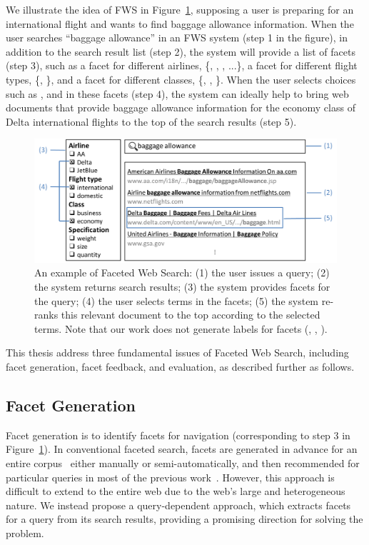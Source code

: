 We illustrate the idea of FWS in Figure~\ref{fig:fws-example}, supposing a user is preparing for an international flight and wants to find baggage allowance information. When the user searches ``baggage allowance'' in an FWS system (step 1 in the figure), in addition to the search result list (step 2), the system will provide a list of facets (step 3), such as a facet for different airlines, \{, , , ...\}, a facet for different flight types, \{, \}, and a facet for different classes, \{, , \}. When the user selects choices such as ,  and  in these facets (step 4), the system can ideally help to bring web documents that provide 
baggage allowance information for the economy class of Delta international flights to the top of the search results (step 5).
\begin{figure}[!ht]
\centering
\includegraphics[width=0.97\columnwidth]{figure/fws-example.png}
\caption{An example of Faceted Web Search: (1) the user issues a query; (2) the system returns search results; (3) the system provides facets for the query; (4) the user selects terms in the facets; (5) the system re-ranks this relevant document to the top according to the selected terms. Note that our work does not generate labels for facets (\eg, , ).}
\label{fig:fws-example}
\end{figure}

This thesis address three fundamental issues of Faceted Web Search, including facet generation, facet feedback, and evaluation, as described further as follows.

\subsection{Facet Generation}
Facet generation is to identify facets for navigation (corresponding to step 3 in Figure~\ref{fig:fws-example}). In conventional faceted search, facets are generated in advance for an entire corpus~\cite{stoica2007automating,dakka2008automatic} either manually or semi-automatically, and then recommended for particular queries in most of the previous work~\cite{teevan2008challenges}. However, this approach is difficult to extend to the entire web due to the web's large and heterogeneous nature. We instead propose a query-dependent approach, which extracts facets for a query from its search results, providing a promising direction for solving the problem. 

